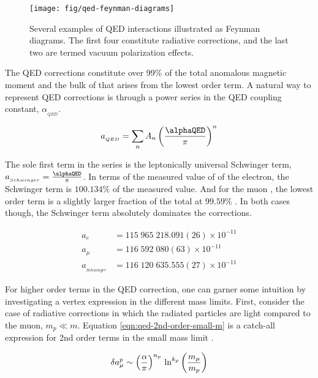 \begin{figure}
\label{fig:qed-feynman-diagrams}
\centering
\texttt{[image: fig/qed-feynman-diagrams]}
\caption{Several examples of QED interactions illustrated as Feynman diagrams.  The first four constitute radiative corrections, and the last two are termed vacuum polarization effects. }
\end{figure}

The QED corrections constitute over 99\% of the total anomalous magnetic moment and the bulk of that arises from the lowest order term.  A natural way to represent QED corrections is through a power series in the QED coupling constant, $\alpha_{_{QED}}$.

\begin{equation}
\label{eqn:qed-correction-series}
a_{_{QED}} = \sum_n{A_n \left(\frac{\alphaQED}{\pi} \right)^n}
\end{equation}

\noindent
The sole first term in the series is the leptonically universal Schwinger term, $a_{_{Schwinger}} = \frac{\alphaQED}{\pi}$.  In terms of the measured value of \gmtwo of the electron, the Schwinger term is $100.134\%$ of the measured value. And for the muon \gmtwo, the lowest order term is a slightly larger fraction of the total at $99.59\%$ \cite{codata}.  In both cases though, the Schwinger term absolutely dominates the corrections.

\begin{align*}
a_{e}   & = 115\;965\;218.091(26) \times 10^{-11} \\
a_{\mu} & = 116\;592\;080(63) \times 10^{-11} \\
a_{_{Schwinger}} & = 116\;120\;635.555(27) \times 10^{-11}
\end{align*}

For higher order terms in the QED correction, one can garner some intuition by investigating a vertex expression in the different mass limits.  First, consider the case of radiative corrections in which the radiated particles are light compared to the muon, $m_p \ll m$.  Equation \ref{eqn:qed-2nd-order-small-m} is a catch-all expression for 2nd order terms in the small mass limit \cite{the-muon-g-2}.

\begin{equation}
\label{eqn:qed-2nd-order-small-m}
\delta a_\mu^p \sim \left(\frac{\alpha}{\pi} \right)^{n_p} \\
\ln^{k_p} \left( \frac{m_\mu}{m_p} \right)
\end{equation}

